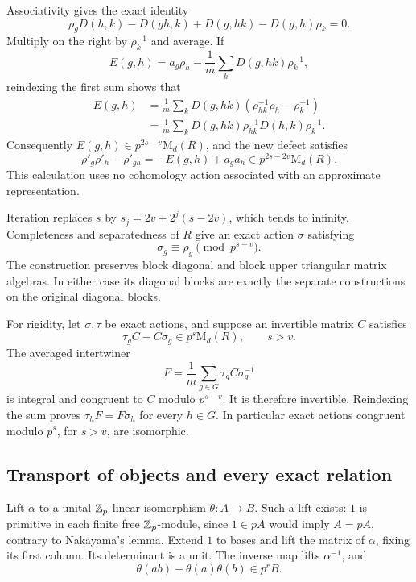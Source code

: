 Associativity gives the exact identity
\[
 \rho_gD(h,k)-D(gh,k)+D(g,hk)-D(g,h)\rho_k=0.
\]
Multiply on the right by $\rho_k^{-1}$ and average.  If
\[
 E(g,h)=a_g\rho_h-\frac1m\sum_kD(g,hk)\rho_k^{-1},
\]
reindexing the first sum shows that
\begin{align*}
 E(g,h)
 &=\frac1m\sum_kD(g,hk)
       (\rho_{hk}^{-1}\rho_h-\rho_k^{-1})\\
 &=\frac1m\sum_kD(g,hk)\rho_{hk}^{-1}D(h,k)\rho_k^{-1}.
\end{align*}
Consequently $E(g,h)\in p^{2s-v}\mathrm{M}_d(R)$, and the new
defect satisfies
\begin{equation}\label{eq:congruence-improvement}
 \rho'_g\rho'_h-\rho'_{gh}
   =-E(g,h)+a_ga_h\in p^{2s-2v}\mathrm{M}_d(R).
\end{equation}
This calculation uses no cohomology action associated with an
approximate representation.

Iteration replaces $s$ by
$s_j=2v+2^j(s-2v)$, which tends to infinity.  Completeness and
separatedness of $R$ give an exact action $\sigma$ satisfying
\begin{equation}\label{eq:congruence-corrected}
 \sigma_g\equiv\rho_g\pmod {p^{s-v}}.
\end{equation}
The construction preserves block diagonal and block upper triangular
matrix algebras.  In either case its diagonal blocks are exactly
the separate constructions on the original diagonal blocks.

For rigidity, let $\sigma,\tau$ be exact actions, and suppose an
invertible matrix $C$ satisfies
\[
 \tau_gC-C\sigma_g\in p^s\mathrm{M}_d(R),\qquad s>v.
\]
The averaged intertwiner
\begin{equation}\label{eq:congruence-intertwiner}
 F=\frac1m\sum_{g\in G}\tau_gC\sigma_g^{-1}
\end{equation}
is integral and congruent to $C$ modulo $p^{s-v}$.  It is therefore
invertible.  Reindexing the sum proves $\tau_hF=F\sigma_h$ for
every $h\in G$.  In particular exact actions congruent modulo
$p^s$, for $s>v$, are isomorphic.

\subsection{Transport of objects and every exact relation}

Lift $\alpha$ to a unital $\mathbb Z_p$-linear isomorphism
$\theta:A\to B$.  Such a lift exists: $1$ is primitive in each
finite free $\mathbb Z_p$-module, since $1\in pA$ would imply $A=pA$,
contrary to Nakayama's lemma.  Extend $1$ to bases and lift the
matrix of $\alpha$, fixing its first column.  Its determinant is a
unit.  The inverse map lifts $\alpha^{-1}$, and
\begin{equation}\label{eq:congruence-multiplication}
 \theta(ab)-\theta(a)\theta(b)\in p^rB.
\end{equation}

